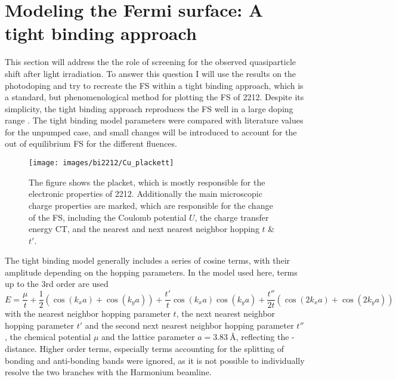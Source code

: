 \section{Modeling the Fermi surface: A tight binding approach}
\label{sec:tb}

This section will address the the role of screening for the observed quasiparticle shift after light irradiation.
To answer this question I will use the results on the photodoping and try to recreate the FS within a tight binding approach, which is a standard, but phenomenological method for plotting the FS of 2212.
Despite its simplicity, the tight binding approach reproduces the FS well in a large doping range \cite{markiewicz_one-band_2005}.
The tight binding model parameters were compared with literature values for the unpumped case, and small changes will be introduced to account for the out of equilibrium FS for the different fluences.

\begin{figure}
	\centering
	\texttt{[image: images/bi2212/Cu\_plackett]}
	\caption{The figure shows the  placket, which is mostly responsible for the electronic properties of 2212. Additionally the main microscopic charge properties are marked, which are responsible for the change of the FS, including the Coulomb potential $U$, the charge transfer energy CT, and the nearest and next nearest neighbor hopping $t$ \& $t'$.}
	\label{fig:cuplackett}
\end{figure}

The tight binding model generally includes a series of cosine terms, with their amplitude depending on the hopping parameters.
In the model used here, terms up to the 3rd order are used
\begin{equation}
	E = \frac{\mu}{t} + \frac{1}{2} \left(\cos(k_xa)+\cos(k_ya)\right) + \frac{t'}{t} \cos(k_xa)\cos(k_ya) + \frac{t''}{2t} \left(\cos(2k_xa)+\cos(2k_ya)\right)
\end{equation}
with the nearest neighbor hopping parameter $t$, the next nearest neighbor hopping parameter $t'$ and the second next nearest neighbor hopping parameter $t''$, the chemical potential $\mu$ and the lattice parameter $a=\qty{3.83}{\angstrom}$, reflecting the - distance.
Higher order terms, especially terms accounting for the splitting of bonding and anti-bonding bands were ignored, as it is not possible to individually resolve the two branches with the Harmonium beamline.

